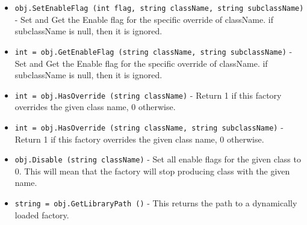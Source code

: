 \begin{itemize}
\item  \verb|obj.SetEnableFlag (int flag, string className, string subclassName)| -  Set and Get the Enable flag for the specific override of className.
 if subclassName is null, then it is ignored.

\item  \verb|int = obj.GetEnableFlag (string className, string subclassName)| -  Set and Get the Enable flag for the specific override of className.
 if subclassName is null, then it is ignored.

\item  \verb|int = obj.HasOverride (string className)| -  Return 1 if this factory overrides the given class name, 0 otherwise.

\item  \verb|int = obj.HasOverride (string className, string subclassName)| -  Return 1 if this factory overrides the given class name, 0 otherwise.

\item  \verb|obj.Disable (string className)| -  Set all enable flags for the given class to 0.  This will
 mean that the factory will stop producing class with the given
 name.

\item  \verb|string = obj.GetLibraryPath ()| -  This returns the path to a dynamically loaded factory.

\end{itemize}
